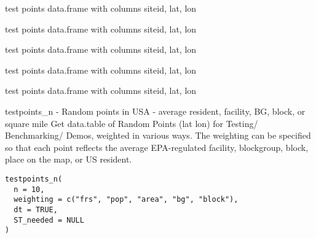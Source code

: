 \documentclass[a4paper]{book}
\begin{document}
%
\begin{SeeAlso}\relax
{}    
\end{SeeAlso}
%
\begin{Description}\relax
test points data.frame with columns siteid, lat, lon

test points data.frame with columns siteid, lat, lon
\end{Description}
%
\begin{Description}\relax
test points data.frame with columns siteid, lat, lon
\end{Description}
%
\begin{Description}\relax
test points data.frame with columns siteid, lat, lon
\end{Description}
%
\begin{Description}\relax
test points data.frame with columns siteid, lat, lon
\end{Description}
%
\begin{Description}\relax
testpoints\_n - Random points in USA - average resident, facility, BG, block, or square mile
Get data.table of Random Points (lat lon) for Testing/ Benchmarking/ Demos, weighted in various ways.
The weighting can be specified so that each point reflects the average EPA-regulated
facility, blockgroup, block, place on the map, or US resident.
\end{Description}
%
\begin{Usage}
\begin{verbatim}
testpoints_n(
  n = 10,
  weighting = c("frs", "pop", "area", "bg", "block"),
  dt = TRUE,
  ST_needed = NULL
)
\end{verbatim}
\end{Usage}
\end{document}
